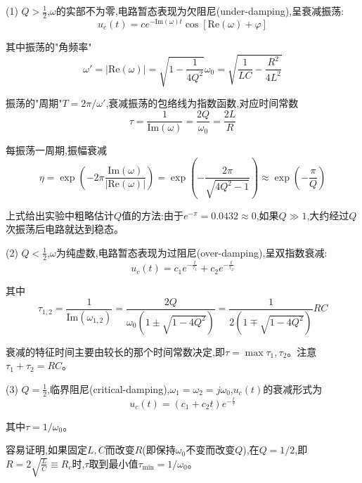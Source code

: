 \documentclass[UTF8]{ctexart}
\begin{document}
(1) $Q>\frac{1}{2}$,$\omega$的实部不为零,电路暂态表现为欠阻尼(under-damping),呈衰减振荡:
\begin{equation}
u_c(t)=ce^{-\text{Im}(\omega)t}\cos[\text{Re}(\omega)+\varphi]
\end{equation}

其中振荡的"角频率"
\begin{equation}
\omega'=|\text{Re}(\omega)|=\sqrt{1-\frac{1}{4Q^2}}\omega_0=\sqrt{\frac{1}{LC}-\frac{R^2}{4L^2}}
\end{equation}

振荡的"周期"$T=2\pi/\omega'$,衰减振荡的包络线为指数函数,对应时间常数
\begin{equation}
\tau=\frac{1}{\text{Im}(\omega)}=\frac{2Q}{\omega_0}=\frac{2L}{R}
\end{equation}

每振荡一周期,振幅衰减
\begin{equation}
\eta=\exp\left(-2\pi\frac{\text{Im}(\omega)}{|\text{Re}(\omega)|}\right)=\exp\left(-\frac{2\pi}{\sqrt{4Q^2-1}}\right)\approx\exp\left(-\frac{\pi}{Q}\right)
\end{equation}

上式给出实验中粗略估计$Q$值的方法:由于$e^{-\pi}=0.0432\approx 0$,如果$Q\gg 1$,大约经过$Q$次振荡后电路就达到稳态。

(2) $Q<\frac{1}{2}$,$\omega$为纯虚数,电路暂态表现为过阻尼(over-damping),呈双指数衰减:
\begin{equation}
u_c(t)=c_1e^{-\frac{t}{\tau_1}}+c_2e^{-\frac{t}{\tau_2}}
\end{equation}

其中
\begin{equation}
\tau_{1,2}=\frac{1}{\text{Im}(\omega_{1,2})}=\frac{2Q}{\omega_0(1\pm\sqrt{1-4Q^2})}=\frac{1}{2(1\mp\sqrt{1-4Q^2})}RC
\end{equation}

衰减的特征时间主要由较长的那个时间常数决定,即$\tau=\max{\tau_1,\tau_2}$。注意$\tau_1+\tau_2=RC$。

(3) $Q=\frac{1}{2}$,临界阻尼(critical-damping),$\omega_1=\omega_2=j\omega_0$,$u_c(t)$的衰减形式为
\begin{equation}
u_c(t)=(c_1+c_2t)e^{-\frac{t}{\tau}}
\end{equation}

其中$\tau=1/\omega_0$。

容易证明,如果固定$L,C$而改变$R$(即保持$\omega_0$不变而改变$Q$),在$Q=1/2$,即$R=2\sqrt{\frac{L}{C}}\equiv R_c$时,$\tau$取到最小值$\tau_{\min}=1/\omega_0$。
\end{document}

